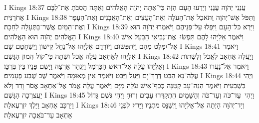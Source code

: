 I Kings 18:37	עֲנֵנִי יְהֹוָה עֲנֵנִי וְיֵדְעוּ הָעָם הַזֶּה כִּי־אַתָּה יְהֹוָה הָאֱלֹהִים וְאַתָּה הֲסִבֹּתָ אֶת־לִבָּם אֲחֹרַנִּית׃
I Kings 18:38	וַתִּפֹּל אֵשׁ־יְהֹוָה וַתֹּאכַל אֶת־הָעֹלָה וְאֶת־הָעֵצִים וְאֶת־הָאֲבָנִים וְאֶת־הֶעָפָר וְאֶת־הַמַּיִם אֲשֶׁר־בַּתְּעָלָה לִחֵכָה׃
I Kings 18:39	וַיַּרְא כּל־הָעָם וַיִּפְּלוּ עַל־פְּנֵיהֶם וַיֹּאמְרוּ יְהֹוָה הוּא הָאֱלֹהִים יְהֹוָה הוּא הָאֱלֹהִים׃
I Kings 18:40	וַיֹּאמֶר אֵלִיָּהוּ לָהֶם תִּפְשׂוּ  אֶת־נְבִיאֵי הַבַּעַל אִישׁ אַל־יִמָּלֵט מֵהֶם וַיִּתְפְּשׂוּם וַיּוֹרִדֵם אֵלִיָּהוּ אֶל־נַחַל קִישׁוֹן וַיִּשְׁחָטֵם שָׁם׃
I Kings 18:41	וַיֹּאמֶר אֵלִיָּהוּ לְאַחְאָב עֲלֵה אֱכֹל וּשְׁתֵה כִּי־קוֹל הֲמוֹן הַגָּשֶׁם׃
I Kings 18:42	וַיַּעֲלֶה אַחְאָב לֶאֱכֹל וְלִשְׁתּוֹת וְאֵלִיָּהוּ עָלָה אֶל־רֹאשׁ הַכַּרְמֶל וַיִּגְהַר אַרְצָה וַיָּשֶׂם פָּנָיו בֵּין בִּרְכָּו׃
I Kings 18:43	וַיֹּאמֶר אֶל־נַעֲרוֹ עֲלֵה־נָא הַבֵּט דֶּרֶךְ־יָם וַיַּעַל וַיַּבֵּט וַיֹּאמֶר אֵין מְאוּמָה וַיֹּאמֶר שֻׁב שֶׁבַע פְּעָמִים׃
I Kings 18:44	וַיְהִי בַּשְּׁבִעִית וַיֹּאמֶר הִנֵּה־עָב קְטַנָּה כְּכַף־אִישׁ עֹלָה מִיָּם וַיֹּאמֶר עֲלֵה אֱמֹר אֶל־אַחְאָב אֱסֹר וָרֵד וְלֹא יַעֲצרְכָה הַגָּשֶׁם׃
I Kings 18:45	וַיְהִי  עַד־כֹּה וְעַד־כֹּה וְהַשָּׁמַיִם הִתְקַדְּרוּ עָבִים וְרוּחַ וַיְהִי גֶּשֶׁם גָּדוֹל וַיִּרְכַּב אַחְאָב וַיֵּלֶךְ יִזְרְעֶאלָה׃
I Kings 18:46	וְיַד־יְהֹוָה הָיְתָה אֶל־אֵלִיָּהוּ וַיְשַׁנֵּס מתְנָיו וַיָּרץ לִפְנֵי אַחְאָב עַד־בֹּאֲכָה יִזְרְעֶאלָה׃
